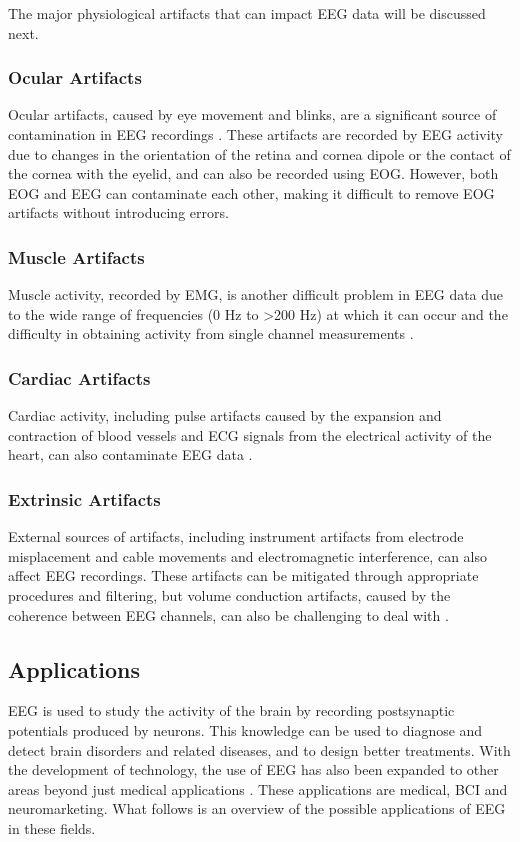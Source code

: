 The major physiological artifacts that can impact \gls{EEG} data will be discussed next.

\subsubsection{Ocular Artifacts}
Ocular artifacts, caused by eye movement and blinks, are a significant source of contamination in \gls{EEG} recordings \cite{wallstrom_automatic_2004}. These artifacts are recorded by \gls{EEG} activity due to changes in the orientation of the retina and cornea dipole or the contact of the cornea with the eyelid, and can also be recorded using \gls{EOG}. However, both \gls{EOG} and \gls{EEG} can contaminate each other, making it difficult to remove \gls{EOG} artifacts without introducing errors. 

\subsubsection{Muscle Artifacts}
Muscle activity, recorded by \gls{EMG}, is another difficult problem in \gls{EEG} data due to the wide range of frequencies (0 Hz to >200 Hz) at which it can occur and the difficulty in obtaining activity from single channel measurements \cite{goncharova_emg_2003}.

\subsubsection{Cardiac Artifacts}
Cardiac activity, including pulse artifacts caused by the expansion and contraction of blood vessels and \gls{ECG} signals from the electrical activity of the heart, can also contaminate \gls{EEG} data \cite{goncharova_emg_2003}.

\subsubsection{Extrinsic Artifacts}
External sources of artifacts, including instrument artifacts from electrode misplacement and cable movements and electromagnetic interference, can also affect \gls{EEG} recordings. These artifacts can be mitigated through appropriate procedures and filtering, but volume conduction artifacts, caused by the coherence between \gls{EEG} channels, can also be challenging to deal with \cite{sweeney_artifact_2012}.


\subsection{Applications}
\gls{EEG} is used to study the activity of the brain by recording postsynaptic potentials produced by neurons. This knowledge can be used to diagnose and detect brain disorders and related diseases, and to design better treatments. With the development of technology, the use of \gls{EEG} has also been expanded to other areas beyond just medical applications \cite{lai_literature_2018}.
These applications are medical, \gls{BCI} and neuromarketing. What follows is an overview of the possible applications of \gls{EEG} in these fields.

